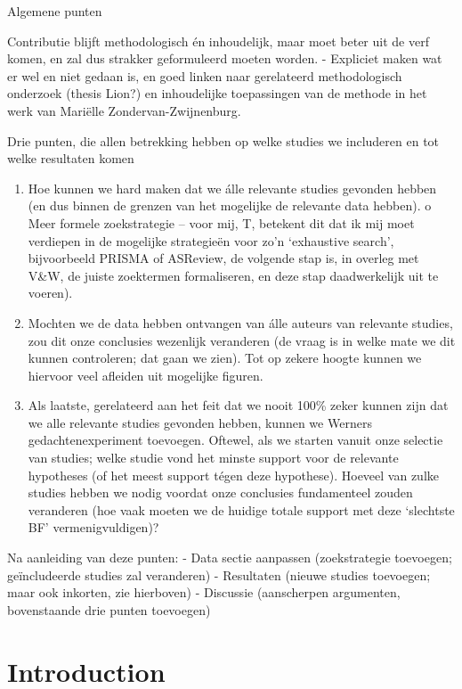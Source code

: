 \documentclass[
  11pt,
]{article}
\providecommand{\tightlist}{%
  \setlength{\itemsep}{0pt}\setlength{\parskip}{0pt}}
\begin{document}
Algemene punten

Contributie blijft methodologisch én inhoudelijk, maar moet beter uit de verf komen, en zal dus strakker geformuleerd moeten worden.
- Expliciet maken wat er wel en niet gedaan is, en goed linken naar gerelateerd methodologisch onderzoek (thesis Lion?) en inhoudelijke toepassingen van de methode in het werk van Mariëlle Zondervan-Zwijnenburg.

Drie punten, die allen betrekking hebben op welke studies we includeren en tot welke resultaten komen

\begin{enumerate}
\def\labelenumi{\arabic{enumi}.}
\tightlist
\item
  Hoe kunnen we hard maken dat we álle relevante studies gevonden hebben (en dus binnen de grenzen van het mogelijke de relevante data hebben).
  o Meer formele zoekstrategie -- voor mij, T, betekent dit dat ik mij moet verdiepen in de mogelijke strategieën voor zo'n `exhaustive search', bijvoorbeeld PRISMA of ASReview, de volgende stap is, in overleg met V\&W, de juiste zoektermen formaliseren, en deze stap daadwerkelijk uit te voeren).
\item
  Mochten we de data hebben ontvangen van álle auteurs van relevante studies, zou dit onze conclusies wezenlijk veranderen (de vraag is in welke mate we dit kunnen controleren; dat gaan we zien). Tot op zekere hoogte kunnen we hiervoor veel afleiden uit mogelijke figuren.
\item
  Als laatste, gerelateerd aan het feit dat we nooit 100\% zeker kunnen zijn dat we alle relevante studies gevonden hebben, kunnen we Werners gedachtenexperiment toevoegen. Oftewel, als we starten vanuit onze selectie van studies; welke studie vond het minste support voor de relevante hypotheses (of het meest support tégen deze hypothese). Hoeveel van zulke studies hebben we nodig voordat onze conclusies fundamenteel zouden veranderen (hoe vaak moeten we de huidige totale support met deze `slechtste BF' vermenigvuldigen)?
\end{enumerate}

Na aanleiding van deze punten:
- Data sectie aanpassen (zoekstrategie toevoegen; geïncludeerde studies zal veranderen)
- Resultaten (nieuwe studies toevoegen; maar ook inkorten, zie hierboven)
- Discussie (aanscherpen argumenten, bovenstaande drie punten toevoegen)

\newpage

\linenumbers

\hypertarget{introduction}{%
\section{Introduction}\label{introduction}}
\end{document}
